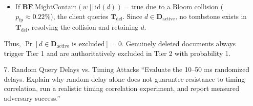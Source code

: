 \documentclass[11pt,a4paper]{article}
\begin{document}
\begin{responsebox}
\begin{itemize}[itemsep=2pt]
\begin{itemize}[itemsep=1pt]
        \item If $\mathbf{BF}.\text{MightContain}(w \parallel \text{id}(d)) = \text{true}$ due to a Bloom collision ($p_{\text{fp}} \approx 0.22\%$), the client queries $\mathbf{T}_{\text{del}}$. Since $d \in \mathbf{D}_{\text{active}}$, no tombstone exists in $\mathbf{T}_{\text{del}}$, resolving the collision and retaining $d$.
    \end{itemize}
    Thus, $\Pr[d \in \mathbf{D}_{\text{active}} \text{ is excluded}] = 0$. Genuinely deleted documents always trigger Tier 1 and are authoritatively excluded in Tier 2 with probability 1.
\end{itemize}
\end{responsebox}

\vspace{1em}

\begin{reviewbox}{7. Random Query Delays vs. Timing Attacks}
``Evaluate the 10--50 ms randomized delays. Explain why random delay alone does not guarantee resistance to timing correlation, run a realistic timing correlation experiment, and report measured adversary success.''
\end{reviewbox}
\end{document}
